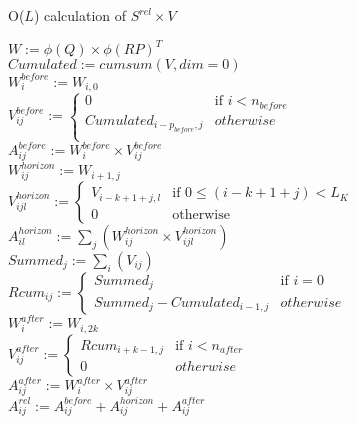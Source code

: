 \begin{algorithm}[!ht]
	\small
	\caption{O($L$) calculation of $S^{rel} \times V$}
	\label{alg:A_rel}
	\vskip12pt
	\vskip12pt
	\vskip12pt
	$W := \phi(Q) \times \phi(RP)^T$\\
	$Cumulated := cumsum(V, dim=0)$\\
	$W^{before}_{i} := W_{i,0}$\\
	$V^{before}_{ij} := 
	\begin{cases}
		0 & \text{if }i < n_{before}\\
		Cumulated_{i-p_{before}, j} & otherwise\\
	\end{cases}$\\
	$A^{before}_{ij} := W^{before}_{i} \times V^{before}_{ij}$\\
	$W^{horizon}_{ij} := W_{i+1,j}$\\
	$V^{horizon}_{ijl} :=
	\begin{cases}
		V_{i-k+1+j, l} & \text{if }0 \leq (i-k+1+j) < L_K\\
		0 & \text{otherwise} 
	\end{cases}$\\
	$A^{horizon}_{il} := \sum_j \left( W^{horizon}_{ij} \times V^{horizon}_{ijl} \right)$\\
	$Summed_{j} := \sum_i \left( V_{ij}\right)$\\
	$Rcum_{ij} := 
	\begin{cases}
		Summed_{j} & \text{if }i=0\\
		Summed_{j} - Cumulated_{i-1,j} & otherwise
	\end{cases}$\\
	$W^{after}_{i} := W_{i, 2k}$\\
	$V^{after}_{ij} := 
	\begin{cases}
		Rcum_{i+k-1,j} & \text{if }i<n_{after}\\
		0 & otherwise
	\end{cases}$\\
	$A^{after}_{ij} := W^{after}_{i} \times V^{after}_{ij}$\\
	$A^{rel}_{ij} := A^{before}_{ij} + A^{horizon}_{ij} + A^{after}_{ij}$
\end{algorithm}

\endinput